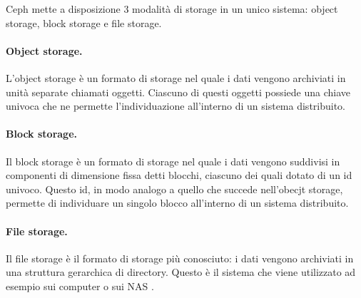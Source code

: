 Ceph mette a disposizione 3 modalità di storage in un unico sistema: object storage, block storage e file storage.

\paragraph{Object storage.} L'object storage è un formato di storage nel quale i dati vengono archiviati in unità separate chiamati oggetti. Ciascuno di questi oggetti possiede una chiave univoca che ne permette l'individuazione all'interno di un sistema distribuito.

\paragraph{Block storage.} Il block storage è un formato di storage nel quale i dati vengono suddivisi in componenti di dimensione fissa detti blocchi, ciascuno dei quali dotato di un id univoco. Questo id, in modo analogo a quello che succede nell'obecjt storage, permette di individuare un singolo blocco all'interno di un sistema distribuito.

\paragraph{File storage.} Il file storage è il formato di storage più conosciuto: i dati vengono archiviati in una struttura gerarchica di directory. Questo è il sistema che viene utilizzato ad esempio sui computer o sui NAS \cite{storage_formats_description}.